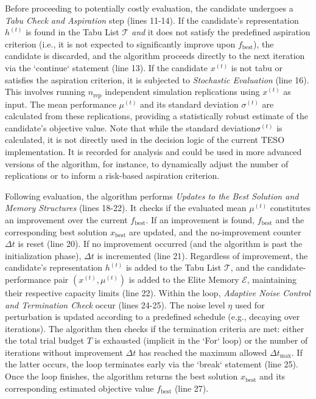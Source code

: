 \documentclass{article}
\begin{document}
Before proceeding to potentially costly evaluation, the candidate undergoes a \textit{Tabu Check and Aspiration} step (lines 11-14). If the candidate's representation $h^{(t)}$ is found in the Tabu List $\mathcal{T}$ \textit{and} it does not satisfy the predefined aspiration criterion (i.e., it is not expected to significantly improve upon $f_{\text{best}}$), the candidate is discarded, and the algorithm proceeds directly to the next iteration via the `continue` statement (line 13). If the candidate $x^{(t)}$ is not tabu or satisfies the aspiration criterion, it is subjected to \textit{Stochastic Evaluation} (line 16). This involves running $n_{\text{rep}}$ independent simulation replications using $x^{(t)}$ as input. The mean performance $\mu^{(t)}$ and its standard deviation $\sigma^{(t)}$ are calculated from these replications, providing a statistically robust estimate of the candidate's objective value. Note that while the standard deviation$\sigma^{(t)}$ is calculated, it is not directly used in the decision logic of the current TESO implementation. It is recorded for analysis and could be used in more advanced versions of the algorithm, for instance, to dynamically adjust the number of replications or to inform a risk-based aspiration criterion.

Following evaluation, the algorithm performs \textit{Updates to the Best Solution and Memory Structures} (lines 18-22). It checks if the evaluated mean $\mu^{(t)}$ constitutes an improvement over the current $f_{\text{best}}$. If an improvement is found, $f_{\text{best}}$ and the corresponding best solution $x_{\text{best}}$ are updated, and the no-improvement counter $\Delta t$ is reset (line 20). If no improvement occurred (and the algorithm is past the initialization phase), $\Delta t$ is incremented (line 21). Regardless of improvement, the candidate's representation $h^{(t)}$ is added to the Tabu List $\mathcal{T}$, and the candidate-performance pair $(x^{(t)}, \mu^{(t)})$ is added to the Elite Memory $\mathcal{E}$, maintaining their respective capacity limits (line 22). Within the loop, \textit{Adaptive Noise Control and Termination Check} occur (lines 24-25). The noise level $\eta$ used for perturbation is updated according to a predefined schedule (e.g., decaying over iterations). The algorithm then checks if the termination criteria are met: either the total trial budget $T$ is exhausted (implicit in the `For` loop) or the number of iterations without improvement $\Delta t$ has reached the maximum allowed $\Delta t_{\text{max}}$. If the latter occurs, the loop terminates early via the `break` statement (line 25). Once the loop finishes, the algorithm returns the best solution $x_{\text{best}}$ and its corresponding estimated objective value $f_{\text{best}}$ (line 27).
\end{document}
